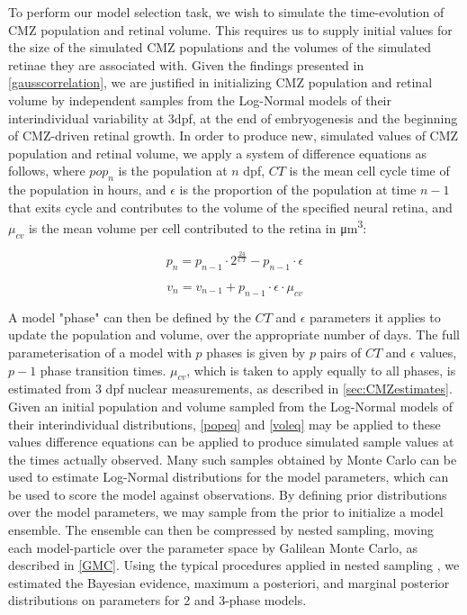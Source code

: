 To perform our model selection task, we wish to simulate the time-evolution of CMZ population and retinal volume. This requires us to supply initial values for the size of the simulated CMZ populations and the volumes of the simulated retinae they are associated with. Given the findings presented in \autoref{gausscorrelation}, we are justified in initializing CMZ population and retinal volume by independent samples from the Log-Normal models of their interindividual variability at 3dpf, at the end of embryogenesis and the beginning of CMZ-driven retinal growth. In order to produce new, simulated values of CMZ population and retinal volume, we apply a system of difference equations as follows, where $pop_n$ is the population at $n$ dpf, $CT$ is the mean cell cycle time of the population in hours, and $\epsilon$ is the proportion of the population at time $n-1$ that exits cycle and contributes to the volume of the specified neural retina, and $\mu_{cv}$ is the mean volume per cell contributed to the retina in \si{\cubic\micro\metre}:

\begin{equation}
    p_n=p_{n-1} \cdot 2^{\frac{24}{CT}} - p_{n-1} \cdot \epsilon
    \label{popeq}
\end{equation}

\begin{equation}
    v_n=v_{n-1} + p_{n-1} \cdot \epsilon \cdot \mu_{cv}
    \label{voleq}
\end{equation}

A model "phase" can then be defined by the $CT$ and $\epsilon$ parameters it applies to update the population and volume, over the appropriate number of days. The full parameterisation of a model with $p$ phases is given by $p$ pairs of $CT$ and $\epsilon$ values, $p-1$ phase transition times. $\mu_{cv}$, which is taken to apply equally to all phases, is estimated from 3 dpf nuclear measurements, as described in \autoref{sec:CMZestimates}. Given an initial population and volume sampled from the Log-Normal models of their interindividual distributions, \autoref{popeq} and \autoref{voleq} may be applied to these values difference equations can be applied to produce simulated sample values at the times actually observed. Many such samples obtained by Monte Carlo can be used to estimate Log-Normal distributions for the model parameters, which can be used to score the model against observations. By defining prior distributions over the model parameters, we may sample from the prior to initialize a model ensemble. The ensemble can then be compressed by nested sampling, moving each model-particle over the parameter space by Galilean Monte Carlo, as described in \autoref{GMC}. Using the typical procedures applied in nested sampling \cite{Skilling2006}, we estimated the Bayesian evidence, maximum a posteriori, and marginal posterior distributions on parameters for 2 and 3-phase models.

